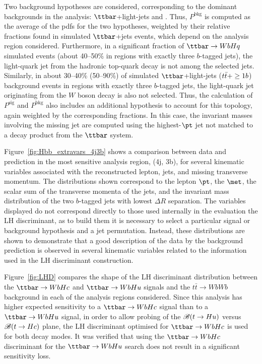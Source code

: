 Two background hypotheses are considered, corresponding to the dominant backgrounds in
the analysis: $\ttbar$+light-jets and \ttbin. Thus, $P^\textrm{bkg}$ is computed as the average of
the pdfs for the two hypotheses, weighted by their relative fractions found in simulated $\ttbar$+jets events, which depend
on the analysis region considered. Furthermore, in a significant fraction of $\Hq$ simulated events (about 40--50\% in regions with exactly three $b$-tagged jets), 
the light-quark jet from the hadronic top-quark decay is not among the selected jets.
Similarly, in about 30--40\% (50--90\%) of simulated $\ttbar$+light-jets ($t\bar{t}+\geq1b$) background events in regions with exactly three $b$-tagged jets, 
the light-quark jet originating from the $W$ boson decay is also not selected. Thus, the calculation of $P^\textrm{sig}$ and
$P^\textrm{bkg}$ also includes an additional hypothesis to account for this topology, again weighted by the corresponding fractions. 
In this case, the invariant masses involving the missing jet are computed using the highest-$\pt$ jet not matched 
to a decay product from the $\ttbar$ system.


Figure~\ref{fig:Hbb_extravars_4j3b} shows a comparison between data and prediction in the most sensitive analysis region, (4j, 3b), 
for several kinematic variables associated with the reconstructed lepton, jets, and missing transverse momentum. 
The distributions shown correspond to the lepton $\pt$, the $\met$, the scalar sum of the transverse momenta of 
the jets, and the invariant mass distribution of the two $b$-tagged jets with lowest $\Delta R$ separation. 
The variables displayed do not correspond directly to those used internally in the evaluation the LH discriminant, as to build them it is necessary 
to select a particular signal or background hypothesis and a jet permutation. Instead, these distributions are shown to demonstrate that
a good description of the data by the background prediction is observed in several kinematic variables related to the information used in 
the LH discriminant construction. 

Figure~\ref{fig:LHD} compares the shape of the LH discriminant distribution between the $\Hc$ and $\Hu$ signals and the 
$t\bar{t}\to WbWb$ background in each of the analysis regions considered.
Since this analysis has higher expected sensitivity to a $\Hc$ signal than to a $\Hu$ signal, in order to allow probing 
of the $\mathscr{B}(t\to Hu)$ versus $\mathscr{B}(t\to Hc)$ plane, the LH discriminant optimised for $\Hc$ is used for both 
decay modes. It was verified that using the $\Hc$ discriminant for the $\Hu$ search does not result in a significant sensitivity loss.

